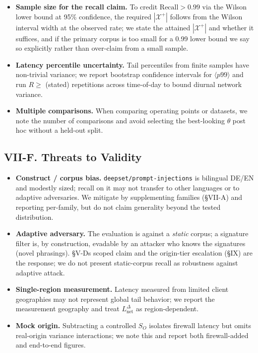 \begin{itemize}
\tightlist
\item
  \textbf{Sample size for the recall claim.} To credit
  \(\text{Recall}>0.99\) via the Wilson lower bound at 95\% confidence,
  the required \(|\mathcal{X}^{+}|\) follows from the Wilson interval
  width at the observed rate; we state the attained
  \(|\mathcal{X}^{+}|\) and whether it suffices, and if the primary
  corpus is too small for a 0.99 lower bound we say so explicitly rather
  than over-claim from a small sample.
\item
  \textbf{Latency percentile uncertainty.} Tail percentiles from finite
  samples have non-trivial variance; we report bootstrap confidence
  intervals for \(\langle p99\rangle\) and run \(R\ge\) (stated)
  repetitions across time-of-day to bound diurnal network variance.
\item
  \textbf{Multiple comparisons.} When comparing operating points or
  datasets, we note the number of comparisons and avoid selecting the
  best-looking \(\theta\) post hoc without a held-out split.
\end{itemize}

\subsection{VII-F. Threats to Validity}\label{vii-f-threats-to-validity}

\begin{itemize}
\tightlist
\item
  \textbf{Construct / corpus bias.}
  \passthrough{\lstinline!deepset/prompt-injections!} is bilingual DE/EN
  and modestly sized; recall on it may not transfer to other languages
  or to adaptive adversaries. We mitigate by supplementing families
  (§VII-A) and reporting per-family, but do not claim generality beyond
  the tested distribution.
\item
  \textbf{Adaptive adversary.} The evaluation is against a \emph{static}
  corpus; a signature filter is, by construction, evadable by an
  attacker who knows the signatures (novel phrasings).
  §V-D\textquotesingle s scoped claim and the origin-tier escalation
  (§IX) are the response; we do not present static-corpus recall as
  robustness against adaptive attack.
\item
  \textbf{Single-region measurement.} Latency measured from limited
  client geographies may not represent global tail behavior; we report
  the measurement geography and treat \(L_{\text{net}}^{\Delta}\) as
  region-dependent.
\item
  \textbf{Mock origin.} Subtracting a controlled \(S_O\) isolates
  firewall latency but omits real-origin variance interactions; we note
  this and report both firewall-added and end-to-end figures.
\end{itemize}

